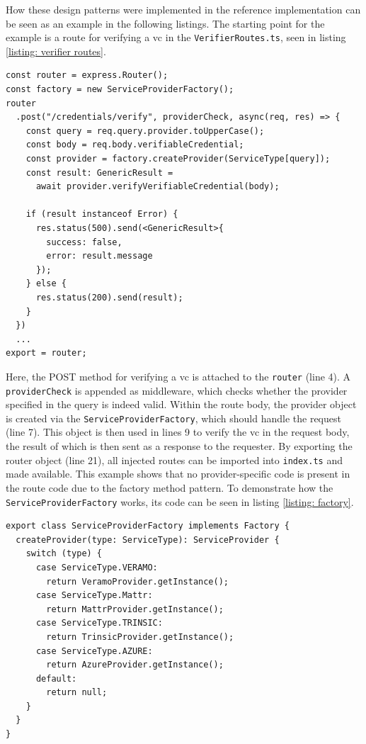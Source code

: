     How these design patterns were implemented in the reference implementation can be seen as an example in the following listings. The starting point for the example is a route for verifying a \ac{vc} in the \texttt{VerifierRoutes.ts}, seen in listing \ref{listing: verifier routes}.
    \newline

    \begin{lstlisting}[style=ES6, caption=Extract of verifier routes, label={listing: verifier routes}]
const router = express.Router();
const factory = new ServiceProviderFactory();
router
  .post("/credentials/verify", providerCheck, async(req, res) => {
    const query = req.query.provider.toUpperCase();
    const body = req.body.verifiableCredential;
    const provider = factory.createProvider(ServiceType[query]);
    const result: GenericResult =
      await provider.verifyVerifiableCredential(body);
      
    if (result instanceof Error) {
      res.status(500).send(<GenericResult>{ 
        success: false, 
        error: result.message 
      });
    } else {
      res.status(200).send(result);
    }
  })
  ...
export = router;
\end{lstlisting}

    Here, the POST method for verifying a \ac{vc} is attached to the \texttt{router} (line 4). A \texttt{providerCheck} is appended as middleware, which checks whether the provider specified in the query is indeed valid. Within the route body, the provider object is created via the \texttt{ServiceProviderFactory}, which should handle the request (line 7). This object is then used in lines 9 to verify the \ac{vc} in the request body, the result of which is then sent as a response to the requester. By exporting the router object (line 21), all injected routes can be imported into \texttt{index.ts} and made available. This example shows that no provider-specific code is present in the route code due to the factory method pattern. To demonstrate how the \texttt{ServiceProviderFactory} works, its code can be seen in listing \ref{listing: factory}.
    \newline
    
    \begin{lstlisting}[style=ES6, caption=Extract of service provider factory, label={listing: factory}]
export class ServiceProviderFactory implements Factory {
  createProvider(type: ServiceType): ServiceProvider {
    switch (type) {
      case ServiceType.VERAMO:
        return VeramoProvider.getInstance();
      case ServiceType.Mattr:
        return MattrProvider.getInstance();
      case ServiceType.TRINSIC:
        return TrinsicProvider.getInstance();
      case ServiceType.AZURE:
        return AzureProvider.getInstance();
      default:
        return null;
    }
  }
}
\end{lstlisting}

